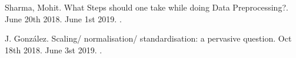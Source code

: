 \documentclass{article}
\begin{document}
\begin{thebibliography}{1}
Sharma, Mohit.
\newblock What Steps should one take while doing Data Preprocessing?.
\newblock June 20th 2018.
\newblock June 1st 2019.
.

J. González.
\newblock Scaling/ normalisation/ standardisation: a pervasive question.
\newblock Oct 18th 2018.
\newblock June 3st 2019.
.
  

\end{thebibliography}


\end{document}
